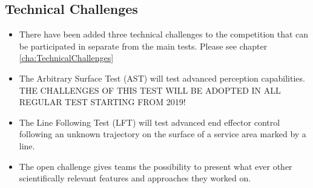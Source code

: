 \subsection{Technical Challenges}
\begin{itemize}
  \item There have been added three technical challenges to the competition that can be participated in separate from the main tests. Please see chapter \ref{cha:TechnicalChallenges}
  \item The Arbitrary Surface Test (AST) will test advanced perception capabilities. THE CHALLENGES OF THIS TEST WILL BE ADOPTED IN ALL REGULAR TEST STARTING FROM 2019!
  \item The Line Following Test (LFT) will test advanced end effector control following an unknown trajectory on the surface of a service area marked by a line.
  \item The open challenge gives teams the possibility to present what ever other scientifically relevant features and approaches they worked on.
\end{itemize}
